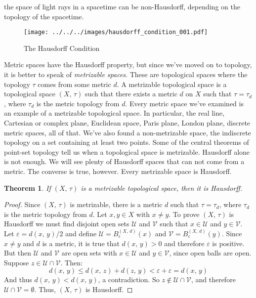 \documentclass{article}
\theoremstyle{plain}
\newtheorem{theorem}{Theorem}[section]
\theoremstyle{normal}
\newenvironment{definition}{%
    \pushQED{\qed}\renewcommand{\qedsymbol}{$\blacksquare$}\definitionx%
}{%
    \popQED\enddefinitionx%
}
\begin{document}
    the space of light rays in a spacetime can be non-Hausdorff, depending on
    the topology of the spacetime.
    \par\hfill\par
    \begin{figure}
        \centering
        \texttt{[image: ../../../images/hausdorff\_condition\_001.pdf]}
        \caption{The Hausdorff Condition}
        \label{fig:hausdorff_condition_001}
    \end{figure}
    Metric spaces have the Hausdorff property, but since we've moved on to
    topology, it is better to speak of \textit{metrizable spaces}. These are
    topological spaces where the topology $\tau$ comes from some metric $d$.
    \begin{definition}[\textbf{Metrizable Topological Space}]
        A metrizable topological space is a topological space $(X,\,\tau)$ such
        that there exists a metric $d$ on $X$ such that $\tau=\tau_{d}$,
        where $\tau_{d}$ is the metric topology from $d$.
    \end{definition}
    Every metric space we've examined is an example of a metrizable topological
    space. In particular, the real line, Cartesian or complex plane,
    Euclidean space, Paris plane, London plane, discrete metric spaces,
    all of that. We've also found a non-metrizable space, the indiscrete
    topology on a set containing at least two points. Some of the central
    theorems of point-set topology tell us when a topological space is
    metrizable. Hausdorff alone is not enough. We will see plenty of Hausdorff
    spaces that can not come from a metric. The converse is true, however. Every
    metrizable space is Hausdorff.
    \begin{theorem}
        If $(X,\,\tau)$ is a metrizable topological space, then it is
        Hausdorff.
    \end{theorem}
    \begin{proof}
        Since $(X,\,\tau)$ is metrizable, there is a metric $d$ such that
        $\tau=\tau_{d}$, where $\tau_{d}$ is the metric topology from $d$.
        Let $x,y\in{X}$ with $x\ne{y}$. To prove $(X,\,\tau)$ is Hausdorff we
        must find disjoint open sets $\mathcal{U}$ and $\mathcal{V}$ such that
        $x\in\mathcal{U}$ and $y\in\mathcal{V}$. Let
        $\varepsilon=d(x,\,y)/2$ and define
        $\mathcal{U}=B_{\varepsilon}^{(X,\,d)}(x)$ and
        $\mathcal{V}=B_{\varepsilon}^{(X,\,d)}(y)$. Since $x\ne{y}$ and $d$
        is a metric, it is true that $d(x,\,y)>0$ and therefore $\varepsilon$
        is positive. But then $\mathcal{U}$ and $\mathcal{V}$ are open sets
        with $x\in\mathcal{U}$ and $y\in\mathcal{V}$, since open balls are open.
        Suppose $z\in\mathcal{U}\cap\mathcal{V}$. Then:
        \begin{equation}
            d(x,\,y)
            \leq{d}(x,\,z)+d(z,\,y)
            <\varepsilon+\varepsilon
            =d(x,\,y)
        \end{equation}
        And thus $d(x,\,y)<d(x,\,y)$, a contradiction. So
        $z\notin\mathcal{U}\cap\mathcal{V}$, and therefore
        $\mathcal{U}\cap\mathcal{V}=\emptyset$. Thus, $(X,\,\tau)$ is
        Hausdorff.
    \end{proof}
\end{document}
